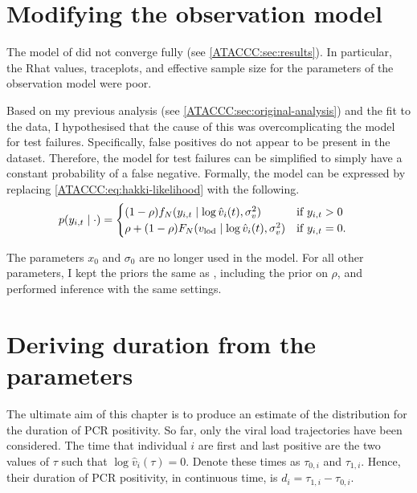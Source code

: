 \documentclass[thesis.tex]{subfiles}
\begin{document}
\section{Modifying the observation model} \label{ATACCC:sec:observation-modification}

The model of \textcite{hakkiOnset} did not converge fully (see \cref{ATACCC:sec:results}).
In particular, the Rhat values, traceplots, and effective sample size for the parameters of the observation model were poor.

Based on my previous analysis (see \cref{ATACCC:sec:original-analysis}) and the fit to the data, I hypothesised that the cause of this was overcomplicating the model for test failures.
Specifically, false positives do not appear to be present in the dataset.
Therefore, the model for test failures can be simplified to simply have a constant probability of a false negative.
Formally, the model can be expressed by replacing \cref{ATACCC:eq:hakki-likelihood} with the following.
\begin{align}
p(y_{i,t} \mid \cdot) &= \begin{cases}
    (1 - \rho) f_N(y_{i,t} \mid \log \hat{v}_i(t), \sigma_v^2) & \text{if $y_{i,t} > 0$}\\
    \rho + (1 - \rho) F_N(v_\text{lod} \mid \log \hat{v}_i(t), \sigma_v^2) & \text{if $y_{i,t} = 0$.}
\end{cases}
\end{align}

The parameters $x_0$ and $\sigma_0$ are no longer used in the model.
For all other parameters, I kept the priors the same as \textcite{hakkiOnset}, including the prior on $\rho$, and performed inference with the same settings.


\section{Deriving duration from the parameters} \label{ATACCC:sec:duration}
The ultimate aim of this chapter is to produce an estimate of the distribution for the duration of PCR positivity.
So far, only the viral load trajectories have been considered.
The time that individual $i$ are first and last positive are the two values of $\tau$ such that $\log \hat{v}_i(\tau) = 0$.
Denote these times as $\tau_{0,i}$ and $\tau_{1,i}$.
Hence, their duration of PCR positivity, in continuous time, is $d_i = \tau_{1,i} - \tau_{0,i}$.
\end{document}
